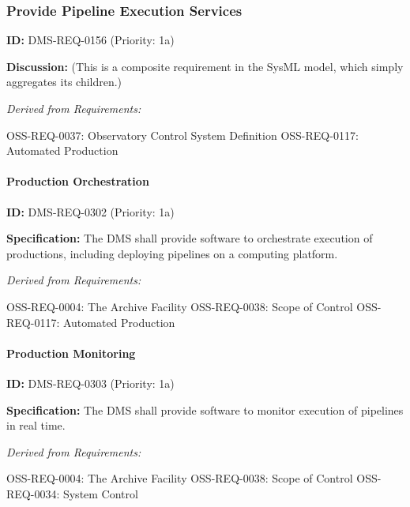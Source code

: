 \documentclass[SE,toc,lsstdraft]{lsstdoc}
\begin{document}
\subsubsection{Provide Pipeline Execution Services}

\label{DMS-REQ-0156}
\textbf{ID:} DMS-REQ-0156 (Priority: 1a)

\textbf{Discussion:}
(This is a composite requirement in the SysML model, which simply aggregates its children.)

\emph{Derived from Requirements:}

OSS-REQ-0037:
Observatory Control System Definition \newline
OSS-REQ-0117:
Automated Production \newline

\paragraph{Production Orchestration}\hfill  %

\label{DMS-REQ-0302}
\textbf{ID:} DMS-REQ-0302 (Priority: 1a)

\textbf{Specification:} The DMS shall provide software to orchestrate execution of productions, including deploying pipelines on a computing platform.

\emph{Derived from Requirements:}

OSS-REQ-0004:
The Archive Facility \newline
OSS-REQ-0038:
Scope of Control \newline
OSS-REQ-0117:
Automated Production \newline

\paragraph{Production Monitoring}\hfill  %

\label{DMS-REQ-0303}
\textbf{ID:} DMS-REQ-0303 (Priority: 1a)

\textbf{Specification:} The DMS shall provide software to monitor execution of pipelines in real time.

\emph{Derived from Requirements:}

OSS-REQ-0004:
The Archive Facility \newline
OSS-REQ-0038:
Scope of Control \newline
OSS-REQ-0034:
System Control \newline
\end{document}
